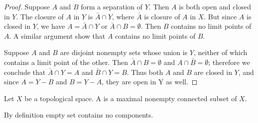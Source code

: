 \documentclass[11pt,a4paper]{article}
\begin{document}
\begin{proof}
\forward Suppose $A$ and $B$ form a separation of $Y$. Then $A$ is both open and closed in $Y$. The closure of $A$ in $Y$ is $\bar{A}\cap Y$, where $\bar{A}$ is closure of $A$ in $X$. But since $A$ is closed in $Y$, we have $A = \bar{A}\cap Y$ or $\bar{A}\cap B=\emptyset$. Then $B$ contains no limit points of $A$. A similar argument show that $A$ contains no limit points of $B$.

\converse Suppose $A$ and $B$ are disjoint nonempty sets whose union is $Y$, neither of which contains a limit point of the other. Then $\bar{A}\cap B = \emptyset$ and $A\cap \bar{B} = \emptyset$; therefore we conclude that $\bar{A}\cap Y = A$ and $\bar{B}\cap Y = B$. Thus both $A$ and $B$ are closed in $Y$, and since $A = Y - B$ and $B = Y - A$, they are open in Y as well.
\end{proof}

\begin{mydef}
Let $X$ be a topological space. A  is a maximal nonempty connected subset of $X$.
\end{mydef}

\begin{remark}
By definition empty set contains no components.
\end{remark}
\end{document}
